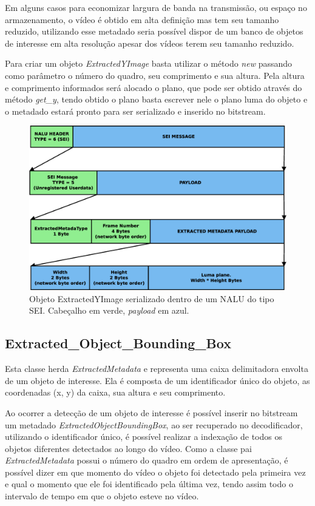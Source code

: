 Em alguns casos para economizar largura de banda na transmissão, ou espaço no armazenamento, o vídeo é obtido em alta definição mas tem seu tamanho reduzido, utilizando esse metadado seria possível dispor de um banco de objetos de interesse em alta resolução apesar dos vídeos terem seu tamanho reduzido.

Para criar um objeto \textit{ExtractedYImage} basta utilizar o método \textit{new} passando como parâmetro o número do quadro, seu comprimento e sua altura. Pela altura e comprimento informados será alocado o plano, que pode ser obtido através do método \textit{get\_y}, tendo obtido o plano basta escrever nele o plano luma do objeto e o metadado estará pronto para ser serializado e inserido no bitstream.


\begin{figure}[H]
\centering
\includegraphics[scale=0.4]{imagens/fig11.eps}
\caption{Objeto ExtractedYImage serializado dentro de um NALU do tipo SEI. Cabeçalho em verde, \textit{payload} em azul.}
\label{fig:extracted_y_image_on_nalu}
\end{figure}


\subsection{ Extracted\_Object\_Bounding\_Box }


Esta classe herda \textit{ExtractedMetadata} e representa uma caixa delimitadora envolta de um objeto de interesse. Ela é composta de um identificador único do objeto, as coordenadas (x, y) da caixa, sua altura e seu comprimento.

Ao ocorrer a detecção de um objeto de interesse é possível inserir no bitstream um metadado \textit{ExtractedObjectBoundingBox}, ao ser recuperado no decodificador, utilizando o identificador único, é possível realizar a indexação de todos os objetos diferentes detectados ao longo do vídeo. Como a classe pai \textit{ExtractedMetadata} possui o número do quadro em ordem de apresentação, é possível dizer em que momento do vídeo o objeto foi detectado pela primeira vez e qual o momento que ele foi identificado pela última vez, tendo assim todo o intervalo de tempo em que o objeto esteve no vídeo.


